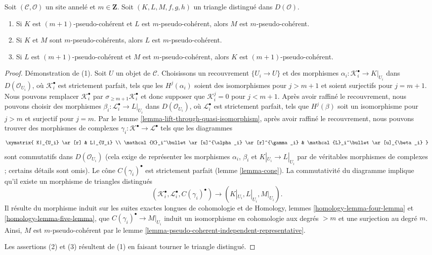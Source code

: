 \begin{lemma}
\label{lemma-cone-pseudo-coherent}
Soit $(\mathcal{C}, \mathcal{O})$ un site annelé et $m \in \mathbf{Z}$.
Soit $(K, L, M, f, g, h)$ un triangle distingué dans $D(\mathcal{O})$.
\begin{enumerate}
\item Si $K$ est $(m + 1)$-pseudo-cohérent et $L$ est $m$-pseudo-cohérent,
alors $M$ est $m$-pseudo-cohérent.
\item Si $K$ et $M$ sont $m$-pseudo-cohérents, alors $L$ est
$m$-pseudo-cohérent.
\item Si $L$ est $(m + 1)$-pseudo-cohérent et $M$ est
$m$-pseudo-cohérent, alors $K$ est $(m + 1)$-pseudo-cohérent.
\end{enumerate}
\end{lemma}

\begin{proof}
Démonstration de (1). Soit $U$ un objet de $\mathcal{C}$. Choisissons un
recouvrement $\{U_i \to U\}$ et des morphismes
$\alpha_i : \mathcal{K}_i^\bullet \to K|_{U_i}$ dans
$D(\mathcal{O}_{U_i})$, où $\mathcal{K}_i^\bullet$ est strictement parfait,
tels que les $H^j(\alpha_i)$ soient des isomorphismes pour $j > m + 1$ et
soient surjectifs pour $j = m + 1$. Nous pouvons remplacer
$\mathcal{K}_i^\bullet$ par
$\sigma_{\geq m + 1}\mathcal{K}_i^\bullet$ et donc supposer que
$\mathcal{K}_i^j = 0$ pour $j < m + 1$. Après avoir raffiné le recouvrement,
nous pouvons choisir des morphismes
$\beta_i : \mathcal{L}_i^\bullet \to L|_{U_i}$ dans
$D(\mathcal{O}_{U_i})$, où $\mathcal{L}_i^\bullet$ est strictement parfait,
tels que $H^j(\beta)$ soit un isomorphisme pour $j > m$ et surjectif pour
$j = m$. Par le lemme \ref{lemma-lift-through-quasi-isomorphism}, après avoir
raffiné le recouvrement, nous pouvons trouver des morphismes de complexes
$\gamma_i : \mathcal{K}^\bullet \to \mathcal{L}^\bullet$ tels que les
diagrammes
$$
\xymatrix{
K|_{U_i} \ar[r] & L|_{U_i} \\
\mathcal{K}_i^\bullet \ar[u]^{\alpha_i} \ar[r]^{\gamma_i} &
\mathcal{L}_i^\bullet \ar[u]_{\beta_i}
}
$$
sont commutatifs dans $D(\mathcal{O}_{U_i})$ (cela exige de représenter les
morphismes $\alpha_i$, $\beta_i$ et $K|_{U_i} \to L|_{U_i}$ par de véritables
morphismes de complexes ; certains détails sont omis). Le cône
$C(\gamma_i)^\bullet$ est strictement parfait (lemme \ref{lemma-cone}).
La commutativité du diagramme implique qu'il existe un morphisme de triangles
distingués
$$
(\mathcal{K}_i^\bullet, \mathcal{L}_i^\bullet, C(\gamma_i)^\bullet)
\longrightarrow
(K|_{U_i}, L|_{U_i}, M|_{U_i}).
$$
Il résulte du morphisme induit sur les suites exactes longues de cohomologie
et de Homology, lemmes \ref{homology-lemma-four-lemma} et
\ref{homology-lemma-five-lemma}, que
$C(\gamma_i)^\bullet \to M|_{U_i}$ induit un isomorphisme en cohomologie aux
degrés $> m$ et une surjection au degré $m$. Ainsi, $M$ est
$m$-pseudo-cohérent par le lemme
\ref{lemma-pseudo-coherent-independent-representative}.

\medskip\noindent
Les assertions (2) et (3) résultent de (1) en faisant tourner le triangle
distingué.
\end{proof}

